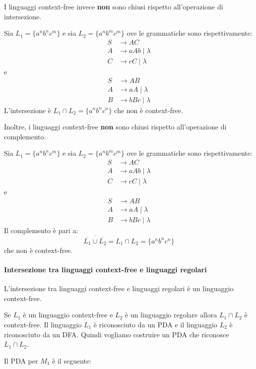 \documentclass[12pt]{report}
\newcounter{theorem}
\begin{document}
I linguaggi context-free invece \textbf{non} sono chiusi rispetto all'operazione di intersezione.
\begin{example}{}{}
Sia $L_1 = \{a^nb^nc^m\}$ e sia $L_2 = \{a^nb^mc^m\}$ ove le grammatiche sono rispettivamente:
\begin{align*}
	S &\to AC \\
	A &\to aAb \mid \lambda \\
	C &\to cC \mid \lambda
\end{align*}
e
\begin{align*}
	S &\to AB \\
	A &\to aA \mid \lambda \\
	B &\to bBc \mid \lambda
\end{align*}
L'intersezione è $L_1 \cap L_2 = \{a^nb^nc^n\}$ che non è context-free.
\end{example}
Inoltre, i linguaggi context-free \textbf{non} sono chiusi rispetto all'operazione di complemento.
\begin{example}{}{}
Sia $L_1 = \{a^nb^nc^m\}$ e sia $L_2 = \{a^nb^mc^m\}$ ove le grammatiche sono rispettivamente:
\begin{align*}
	S &\to AC \\
	A &\to aAb \mid \lambda \\
	C &\to cC \mid \lambda
\end{align*}
e
\begin{align*}
	S &\to AB \\
	A &\to aA \mid \lambda \\
	B &\to bBc \mid \lambda
\end{align*}
Il complemento è pari a:
\[
\overline{\overline{L_1} \cup \overline{L_2}} = L_1 \cap L_2 = \{a^nb^nc^n\}
\]
che non è context-free.
\end{example}
\paragraph{Intersezione tra linguaggi context-free e linguaggi regolari}
\begin{theorem}{}{}
L'intersezione tra linguaggi context-free e linguaggi regolari è un linguaggio context-free.
\end{theorem}
Se $L_1$ è un linguaggio context-free e $L_2$ è un linguaggio regolare allora $L_1 \cap L_2$ è context-free.
Il linguaggio $L_1$ è riconosciuto da un PDA e il linguaggio $L_2$ è riconosciuto da un DFA. Quindi vogliamo costruire un PDA che riconosce $L_1 \cap L_2$.

Il PDA per $M_1$ è il seguente:
\begin{center}
\end{center}
\end{document}
